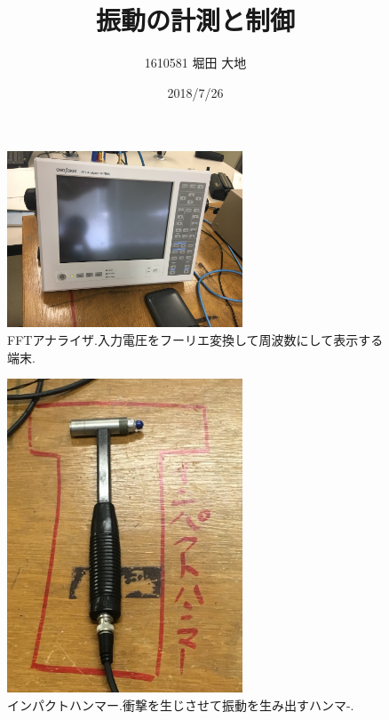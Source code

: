 \documentclass[twocolumn, 10pt,a4j]{jsarticle}
\title{\vspace{-2.5cm}振動の計測と制御}
\author{1610581 堀田 大地}
\date{2018/7/26}
\begin{document}
  \maketitle{}

  
  \begin{figure}[H]
    \begin{center}
      \includegraphics[width=7cm]{../img/IMG_3030.JPG}
      \caption{FFTアナライザ.入力電圧をフーリエ変換して周波数にして表示する端末.}
    \end{center}
  \end{figure}

  \begin{figure}[H]
    \begin{center}
      \includegraphics[width=7cm]{../img/IMG_3027.JPG}
      \caption{インパクトハンマー.衝撃を生じさせて振動を生み出すハンマ-.}
    \end{center}
  \end{figure}
\end{document}
